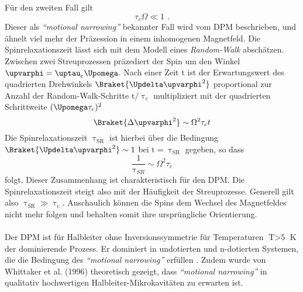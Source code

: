 Für den zweiten Fall gilt
\begin{equation}
\tau_c \Omega \ll 1 \text{ .}
\end{equation}
Dieser als \textit{``motional narrowing''}  bekannter Fall wird vom DPM beschrieben, und ähnelt viel mehr der Präzession in einem inhomogenen Magnetfeld. Die Spinrelaxationszeit lässt sich mit dem Modell eines \textit{Random-Walk} abschätzen. Zwischen zwei Streuprozessen präzediert der Spin um den Winkel $\upvarphi=\uptau_\text{c} \Upomega$. Nach einer Zeit t ist der Erwartungswert des quadrierten Drehwinkels $\Braket{\Updelta\upvarphi^\text{2}}$ proportional zur Anzahl der Random-Walk-Schritte $\text{t}/\uptau_\text{c}$ multipliziert mit der quadrierten Schrittweite $(\Upomega \tau_\text{c})^\text{2}$
\begin{equation}
\Braket{\Delta\upvarphi^2} \sim \Omega^2\tau_c t
\end{equation}
Die Spinrelaxationszeit $\uptau_\text{SR}$ ist hierbei über die Bedingung $\Braket{\Updelta\upvarphi^\text{2}} \sim \text{1}$ bei $\text{t}=\uptau_\text{SR}$ gegeben, so dass 
\begin{equation}
\frac{1}{\uptau_{SR}} \sim \Omega^2\tau_c
\end{equation}
folgt. Dieser Zusammenhang ist charakteristisch für den DPM. Die Spinrelaxationszeit steigt also mit der Häufigkeit der Streuprozesse. Generell gilt also $\uptau_\text{SR} \gg \uptau_\text{c}$.  Anschaulich können die Spins dem Wechsel des Magnetfeldes nicht mehr folgen und behalten somit ihre ursprüngliche Orientierung.\\\\
Der DPM ist für Halbleiter ohne Inversionssymmetrie für Temperaturen $\text{T}>\text{5}$ K der dominierende Prozess. Er dominiert in undotierten und n-dotierten Systemen, die die Bedingung des \textit{``motional narrowing''} erfüllen \cite{Zutic.2004}. Zudem wurde von Whittaker et al. (1996) \cite{Whittaker.1996} theoretisch gezeigt, dass \textit{``motional narrowing''} in qualitativ hochwertigen Halbleiter-Mikrokavitäten zu erwarten ist.
